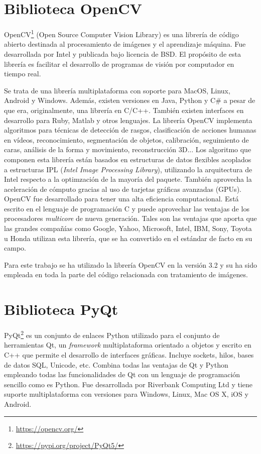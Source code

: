 \section{Biblioteca OpenCV}
OpenCV\footnote{\url{https://opencv.org/}} (Open Source Computer Vision Library) es una librería de código abierto destinada al procesamiento de imágenes y el aprendizaje máquina. Fue desarrollada por Intel y publicada bajo licencia de BSD. El propósito de esta librería es facilitar el desarrollo de programas de visión por computador en tiempo real.

Se trata de una librería multiplataforma con soporte para MacOS, Linux, Android y Windows. Además, existen versiones en Java, Python y C\# a pesar de que era, originalmente, una librería en C/C++. También existen interfaces en desarrollo para Ruby, Matlab y otros lenguajes.
La librería OpenCV implementa algoritmos para técnicas de detección de rasgos, clasificación de acciones humanas en vídeos, reconocimiento, segmentación de objetos, calibración, seguimiento de caras, análisis de la forma y movimiento, reconstrucción 3D... Los algoritmo que componen esta librería están basados en estructuras de datos flexibles acoplados a estructuras IPL (\textit{Intel Image Processing Library}), utilizando la arquitectura de Intel respecto a la optimzación de la mayoría del paquete. También aprovecha la aceleración de cómputo gracias al uso de tarjetas gráficas avanzadas (GPUs). OpenCV fue desarrollado para tener una alta eficiencia computacional. Está escrito en el lenguaje de programación C y puede aprovechar las ventajas de los procesadores \textit{multicore} de nueva generación. Tales son las ventajas que aporta que las grandes compañías como Google, Yahoo, Microsoft, Intel, IBM, Sony, Toyota u Honda utilizan esta librería, que se ha convertido en el estándar de facto en su campo.

Para este trabajo se ha utilizado la librería OpenCV en la versión 3.2 y su ha sido empleada en toda la parte del código relacionada con tratamiento de imágenes.

\section{Biblioteca PyQt}
PyQt\footnote{\url{https://pypi.org/project/PyQt5/}} es un conjunto de enlaces Python utilizado para el conjunto de herramientas Qt, un \textit{framework} multiplataforma orientado a objetos y escrito en C++ que permite el desarrollo de interfaces gráficas. Incluye sockets, hilos, bases de datos SQL, Unicode, etc. Combina todas las ventajas de Qt y Python empleando todas las funcionalidades de Qt con un lenguaje de programación sencillo como es Python. Fue desarrollada por Riverbank Computing Ltd y tiene suporte multiplataforma con versiones para Windows, Linux, Mac OS X, iOS y Android.

